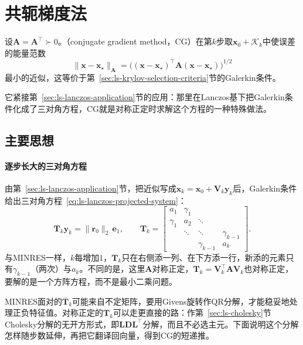 \section{共轭梯度法}
\label{sec:ls-conjugate-gradient}

设$\bm A=\bm A^\top\succ0$。（conjugate gradient method，CG）在第$k$步取$\bm x_0+\mathcal K_k$中使误差的能量范数
\[
 \lVert\bm x-\bm x_\star\rVert_{\bm A}=\bigl((\bm x-\bm x_\star)^\top\bm A(\bm x-\bm x_\star)\bigr)^{1/2}
\]
最小的近似，这等价于第~\ref{sec:ls-krylov-selection-criteria}节的Galerkin条件。

它紧接第~\ref{sec:ls-lanczos-application}节的应用：那里在Lanczos基下把Galerkin条件化成了三对角方程，CG就是对称正定时求解这个方程的一种特殊做法。

\subsection{主要思想}
\label{sec:ls-cg-derivation}

\paragraph{逐步长大的三对角方程}
由第~\ref{sec:ls-lanczos-application}节，把近似写成$\bm x_k=\bm x_0+\bm V_k\bm y_k$后，Galerkin条件给出三对角方程~\eqref{eq:ls-lanczos-projected-system}：
\[
 \bm T_k\bm y_k=\lVert\bm r_0\rVert_2\,\bm e_1,\qquad
 \bm T_k=
 \begin{bmatrix}
 a_1&\gamma_1&&\\
 \gamma_1&a_2&\ddots&\\
 &\ddots&\ddots&\gamma_{k-1}\\
 &&\gamma_{k-1}&a_k
 \end{bmatrix}.
\]
与MINRES一样，$k$每增加$1$，$\bm T_k$只在右侧添一列、在下方添一行，新添的元素只有$\gamma_{k-1}$（两次）与$a_k$。不同的是，这里$\bm A$对称正定，$\bm T_k=\bm V_k^\top\bm A\bm V_k$也对称正定，要解的是一个方阵方程，而不是最小二乘问题。

MINRES面对的$\overline{\bm T}_k$可能来自不定矩阵，要用Givens旋转作QR分解，才能稳妥地处理正负特征值。对称正定的$\bm T_k$可以走更直接的路：作第~\ref{sec:ls-cholesky}节Cholesky分解的无开方形式，即$\bm L\bm D\bm L^\top$分解，而且不必选主元。下面说明这个分解怎样随步数延伸，再把它翻译回向量，得到CG的短递推。

